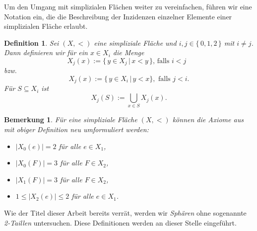 \documentclass[12pt,titlepage,twoside,cleardoublepage]{article}
\theoremstyle{nummermitklammern}
\newtheorem{lemma}[temp]{Lemma}
\newtheorem{definition}[temp]{Definition}
\newtheorem{bemerkung}[temp]{Bemerkung}
\newtheorem{definition}[zahl]{Definition}
\newtheorem{lemma}[zahl]{Lemma}
\newtheorem{bemerkung}[zahl]{Bemerkung}
\numberwithin{equation}{section}
\begin{document}





Um den Umgang mit simplizialen Flächen weiter zu vereinfachen, führen wir eine Notation ein, die die Beschreibung der Inzidenzen einzelner Elemente einer simplizialen Fläche erlaubt.
\begin{definition} 
Sei $(X,<)$ eine simpliziale Fläche und $i,j \in \{\,0,1,2\,\}$ mit $i \neq j$. Dann definieren wir für ein $x \in X_{i}$ die Menge 
\[
X_{j}(x):=\{\,y \in X_{j}\,|\,x < y\,\} \text{, falls $i < j$  }
\]
bzw. 
\[
X_{j}(x):=\{\,y \in X_{i}\,|\,y < x\}, \text{ falls $j<i$}.
\]
Für $S \subseteq X_{i}$ ist 
\[
X_j(S):= \bigcup_{x\in S}X_{j}(x).
\]
\end{definition}
\begin{bemerkung}
Für eine simpliziale Fläche $(X,<)$ können die Axiome aus  mit obiger Definition neu umformuliert werden:
\begin{itemize}
\item $\vert X_{0}(e)\vert=2$ für alle $e \in X_{1}$,
\item $\vert X_{0}(F)\vert=3$ für alle $F \in X_{2}$,
\item $\vert X_{1}(F)\vert=3$ für alle $F \in X_{2}$,
\item $1\leq  \vert X_{2}(e)\vert \leq 2$ für alle $e \in X_{1}$.

\end{itemize}
\end{bemerkung}
Wie der Titel dieser Arbeit bereits verrät, werden wir \emph{Sphären} ohne sogenannte \emph{2-Taillen} untersuchen. Diese Definitionen werden an dieser Stelle eingeführt.
\end{document}
